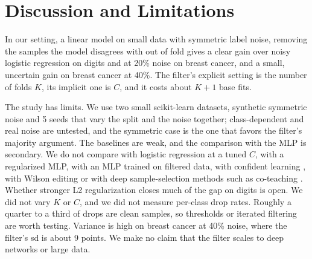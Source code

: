 \section{Discussion and Limitations}\label{sec:conclusion}

In our setting, a linear model on small data with symmetric label noise, removing the samples the model disagrees with out of fold gives a clear gain over noisy logistic regression on digits and at 20\% noise on breast cancer, and a small, uncertain gain on breast cancer at 40\%. The filter's explicit setting is the number of folds $K$, its implicit one is $C$, and it costs about $K+1$ base fits.

The study has limits.
We use two small scikit-learn datasets, synthetic symmetric noise and 5 seeds that vary the split and the noise together; class-dependent and real noise are untested, and the symmetric case is the one that favors the filter's majority argument.
The baselines are weak, and the comparison with the MLP is secondary. We do not compare with logistic regression at a tuned $C$, with a regularized MLP, with an MLP trained on filtered data, with confident learning \citep{northcutt2021confident}, with Wilson editing or with deep sample-selection methods such as co-teaching \citep{han2018coteaching}. Whether stronger L2 regularization closes much of the gap on digits is open.
We did not vary $K$ or $C$, and we did not measure per-class drop rates.
Roughly a quarter to a third of drops are clean samples, so thresholds or iterated filtering are worth testing.
Variance is high on breast cancer at 40\% noise, where the filter's sd is about 9 points.
We make no claim that the filter scales to deep networks or large data.
